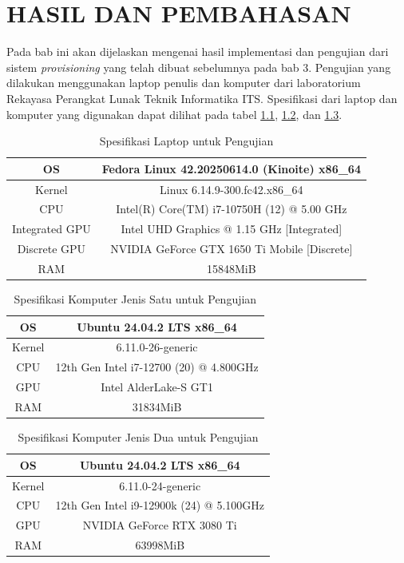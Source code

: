 \chapter{HASIL DAN PEMBAHASAN}
\label{chap:hasil-pembahasan}

Pada bab ini akan dijelaskan mengenai hasil implementasi
dan pengujian dari sistem \emph{provisioning} yang telah
dibuat sebelumnya pada bab 3. Pengujian yang dilakukan
menggunakan laptop penulis dan komputer dari laboratorium Rekayasa Perangkat
Lunak Teknik Informatika ITS. Spesifikasi dari laptop dan komputer
yang digunakan dapat dilihat pada tabel \ref{tb:spesifikasi-laptop-pengujian},
\ref{tb:spesifikasi-komputer-pengujian}, dan \ref{tb:spesifikasi-komputer-pengujian-2}.

\begin{longtable}{|c|c|}
  \caption{Spesifikasi Laptop untuk Pengujian}
  \label{tb:spesifikasi-laptop-pengujian} \\
  \hline
  OS     & Fedora Linux 42.20250614.0 (Kinoite) x86\_64 \\
  \hline
  Kernel & Linux 6.14.9-300.fc42.x86\_64                \\
  \hline
  CPU    & Intel(R) Core(TM) i7-10750H (12) @ 5.00 GHz       \\
  \hline
  Integrated GPU   & Intel UHD Graphics @ 1.15 GHz [Integrated]       \\
  \hline
  Discrete GPU    & NVIDIA GeForce GTX 1650 Ti Mobile [Discrete]       \\
  \hline
  RAM    & 15848MiB       \\
  \hline
\end{longtable}

\begin{longtable}{|c|c|}
  \caption{Spesifikasi Komputer Jenis Satu untuk Pengujian}
  \label{tb:spesifikasi-komputer-pengujian} \\
  \hline
  OS     & Ubuntu 24.04.2 LTS x86\_64 \\
  \hline
  Kernel & 6.11.0-26-generic          \\
  \hline
  CPU    & 12th Gen Intel i7-12700 (20) @ 4.800GHz       \\
  \hline
  GPU    & Intel AlderLake-S GT1       \\
  \hline
  RAM    & 31834MiB       \\
  \hline
\end{longtable}

\begin{longtable}{|c|c|}
  \caption{Spesifikasi Komputer Jenis Dua untuk Pengujian}
  \label{tb:spesifikasi-komputer-pengujian-2} \\
  \hline
  OS     & Ubuntu 24.04.2 LTS x86\_64 \\
  \hline
  Kernel & 6.11.0-24-generic          \\
  \hline
  CPU    & 12th Gen Intel i9-12900k (24) @ 5.100GHz       \\
  \hline
  GPU    & NVIDIA GeForce RTX 3080 Ti       \\
  \hline
  RAM    & 63998MiB       \\
  \hline
\end{longtable}

